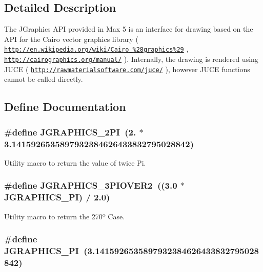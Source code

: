 \subsection{Detailed Description}
The JGraphics API provided in Max 5 is an interface for drawing based on the API for the Cairo vector graphics library ( \href{http://en.wikipedia.org/wiki/Cairo_%28graphics%29}{\tt http://en.wikipedia.org/wiki/Cairo\_\-\%28graphics\%29} , \href{http://cairographics.org/manual/}{\tt http://cairographics.org/manual/} ). Internally, the drawing is rendered using JUCE ( \href{http://rawmaterialsoftware.com/juce/}{\tt http://rawmaterialsoftware.com/juce/} ), however JUCE functions cannot be called directly. 

\subsection{Define Documentation}
\hypertarget{group__jgraphics_gafe32bbcad508a9ef7629a2c47719dcb5}{
\subsubsection[{JGRAPHICS\_\-2PI}]{\setlength{\rightskip}{0pt plus 5cm}\#define JGRAPHICS\_\-2PI~(2. $\ast$ 3.1415926535897932384626433832795028842)}}
\label{group__jgraphics_gafe32bbcad508a9ef7629a2c47719dcb5}


Utility macro to return the value of twice Pi. \hypertarget{group__jgraphics_gae9f23705d238432d1abb58a2ab0ac792}{
\subsubsection[{JGRAPHICS\_\-3PIOVER2}]{\setlength{\rightskip}{0pt plus 5cm}\#define JGRAPHICS\_\-3PIOVER2~((3.0 $\ast$ JGRAPHICS\_\-PI) / 2.0)}}
\label{group__jgraphics_gae9f23705d238432d1abb58a2ab0ac792}


Utility macro to return the 270º Case. \hypertarget{group__jgraphics_gab6eb126ec0f85fa48c30aff48a3e0f5b}{
\subsubsection[{JGRAPHICS\_\-PI}]{\setlength{\rightskip}{0pt plus 5cm}\#define JGRAPHICS\_\-PI~(3.1415926535897932384626433832795028842)}}
\label{group__jgraphics_gab6eb126ec0f85fa48c30aff48a3e0f5b}



